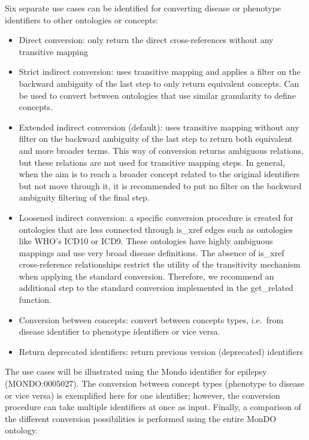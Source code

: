 \documentclass[9pt,a4paper,]{extarticle}
\begin{document}
Six separate use cases can be identified for converting disease or phenotype identifiers to other ontologies or concepts:

\begin{itemize}
\item
  Direct conversion: only return the direct cross-references without any transitive mapping
\item
  Strict indirect conversion: uses transitive mapping and applies a filter on the backward ambiguity of the last step to only return equivalent concepts. Can be used to convert between ontologies that use similar granularity to define concepts.
\item
  Extended indirect conversion (default): uses transitive mapping without any filter on the backward ambiguity of the last step to return both equivalent and more broader terms. This way of conversion returns ambiguous relations, but these relations are not used for transitive mapping steps. In general, when the aim is to reach a broader concept related to the original identifiers but not move through it, it is recommended to put no filter on the backward ambiguity filtering of the final step.
\item
  Loosened indirect conversion: a specific conversion procedure is created for ontologies that are less connected through is\_xref edges such as ontologies like WHO's ICD10 or ICD9. These ontologies have highly ambiguous mappings and use very broad disease definitions. The absence of is\_xref cross-reference relationships restrict the utility of the transitivity mechanism when applying the standard conversion. Therefore, we recommend an additional step to the standard conversion implemented in the get\_related function.
\item
  Conversion between concepts: convert between concepts types, i.e.~from disease identifier to phenotype identifiers or vice versa.
\item
  Return deprecated identifiers: return previous version (deprecated) identifiers
\end{itemize}

The use cases will be illustrated using the Mondo identifier for epilepsy (MONDO:0005027). The conversion between concept types (phenotype to disease or vice versa) is exemplified here for one identifier; however, the conversion procedure can take multiple identifiers at once as input. Finally, a comparison of the different conversion possibilities is performed using the entire MonDO ontology.
\end{document}
